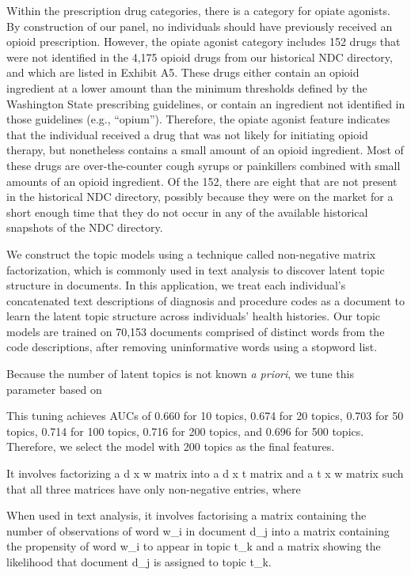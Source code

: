 \documentclass[11pt, letter]{article}
\begin{document}
Within the prescription drug categories, there is a category for opiate agonists. By construction of our panel, no individuals should have previously received an opioid prescription. However, the opiate agonist category includes 152 drugs that were not identified in the 4,175 opioid drugs from our historical NDC directory, and which are listed in Exhibit A5. These drugs either contain an opioid ingredient at a lower amount than the minimum thresholds defined by the Washington State prescribing guidelines, or contain an ingredient not identified in those guidelines (e.g., ``opium''). Therefore, the opiate agonist feature indicates that the individual received a drug that was not likely for initiating opioid therapy, but nonetheless contains a small amount of an opioid ingredient. Most of these drugs are over-the-counter cough syrups or painkillers combined with small amounts of an opioid ingredient. Of the 152, there are eight that are not present in the historical NDC directory, possibly because they were on the market for a short enough time that they do not occur in any of the available historical snapshots of the NDC directory.

We construct the topic models using a technique called non-negative matrix factorization, which is commonly used in text analysis to discover latent topic structure in documents. In this application, we treat each individual's concatenated text descriptions of diagnosis and procedure codes as a document to learn the latent topic structure across individuals' health histories. Our topic models are trained on 70,153 documents comprised of distinct words from the code descriptions, after removing uninformative words using a stopword list.

Because the number of latent topics is not known \emph{a priori}, we tune this parameter based on 

This tuning achieves AUCs of 0.660 for 10 topics, 0.674 for 20 topics, 0.703 for 50 topics, 0.714 for 100 topics, 0.716 for 200 topics, and 0.696 for 500 topics. Therefore, we select the model with 200 topics as the final features.

It involves factorizing a d x w matrix into a d x t matrix and a t x w matrix such that all three matrices have only non-negative entries, where 

When used in text analysis, it involves factorising a matrix containing the number of observations of word w_i in document d_j into a matrix containing the propensity of word w_i to appear in topic t_k and a matrix showing the likelihood that document d_j is assigned to topic t_k.
\end{document}

